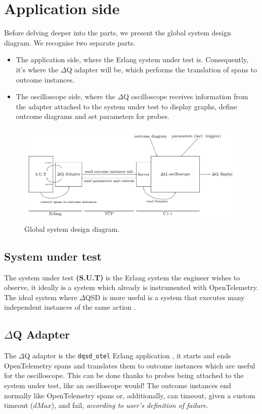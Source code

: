 \section{Application side} 
    
    Before delving deeper into the parts, we present the global system design diagram. We recognise two separate parts.
    \begin{itemize}
        \item The application side, where the Erlang system under test is. Consequently, it's where the $\Delta$Q adapter will be, which performs the translation of spans to outcome instances.
        \item The oscilloscope side, where the $\Delta$Q oscilloscope receives information from the adapter attached to the system under test to display graphs, define outcome diagrams and set parameters for probes.
    \end{itemize}

    \begin{figure}[H]
        \begin{center}
            \includegraphics[width=\textwidth]{tikz/sut-stub-osc.pdf}
        \end{center}
        \caption{Global system design diagram.}
    \end{figure}


    \subsection{System under test} The system under test \textbf{(S.U.T)} is the Erlang system the engineer wishes to observe, it ideally is a system which already is instrumented with OpenTelemetry. The ideal system where $\Delta$QSD is more useful is a system that executes many independent instances of the same action \cite{dq-tut}. 
    
    \subsection{$\Delta$Q Adapter} The $\Delta$Q adapter is the \texttt{dqsd\_otel} Erlang application \cite{wrapper}, it starts and ends OpenTelemetry spans and translates them to outcome instances which are useful for the oscilloscope. This can be done thanks to probes being attached to the system under test, like an oscilloscope would! The outcome instances end normally like OpenTelemetry spans or, additionally, can timeout, given a custom timeout ($dMax$), and fail, \textit{according to user's definition of failure}. 
    
